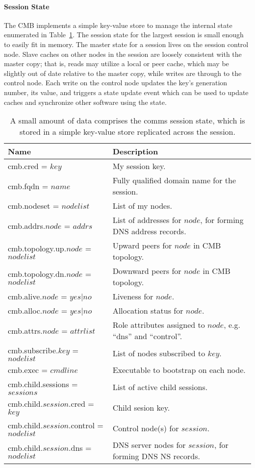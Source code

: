 \paragraph{Session State}
The CMB implements a simple key-value store to manage the
internal state enumerated in Table~\ref{TabCMBState}.
The session state for the largest session is small enough to easily
fit in memory.
The master state for a session lives on the session control node.
Slave caches on other nodes in the session are loosely consistent with
the master copy; that is, reads may utilize a local or peer cache,
which may be slightly out of date relative to the master copy,
while writes are through to the control node.
Each write on the control node updates the key's generation number,
its value, and triggers a state update event which
can be used to update caches and synchronize other software using the
state.

\begin{table}
  \centering
  \begin{tabular}{| l | p{} |}\hline
  \textbf{Name} & \textbf{Description} \\
  \hline
  cmb.cred = $key$ &
        My session key.\\
  cmb.fqdn = $name$ &
        Fully qualified domain name for the session.\\
  cmb.nodeset = $nodelist$ &
        List of my nodes.\\
  cmb.addrs.$node$ = $addrs$ &
        List of addresses for $node$, for forming DNS address records.\\
  cmb.topology.up.$node$ = $nodelist$ & 
        Upward peers for $node$ in CMB topology.\\
  cmb.topology.dn.$node$ = $nodelist$ &
        Downward peers for $node$ in CMB topology.\\
  cmb.alive.$node$ = $yes|no$ &
        Liveness for $node$.\\
  cmb.alloc.$node$ = $yes|no$ &
        Allocation status for $node$.\\
  cmb.attrs.$node$ = $attrlist$ &
	Role attributes assigned to $node$, e.g. ``dns'' and ``control''.\\
  cmb.subscribe.$key$ = $nodelist$ &
        List of nodes subscribed to $key$.\\
  cmb.exec = $cmdline$ &
        Executable to bootstrap on each node.\\
  \hline
  cmb.child.sessions = $sessions$ &
        List of active child sessions.\\
  cmb.child.$session$.cred = $key$ &
        Child sesion key.\\
  cmb.child.$session$.control = $nodelist$ &
        Control node(s) for $session$.\\
  cmb.child.$session$.dns = $nodelist$ &
        DNS server nodes for $session$, for forming DNS NS records.\\
  \hline
  \end{tabular}
  \caption{A small amount of data comprises the comms session state,
	   which is stored in a simple key-value store replicated across
	   the session.}
  \label{TabCMBState}
\end{table}

